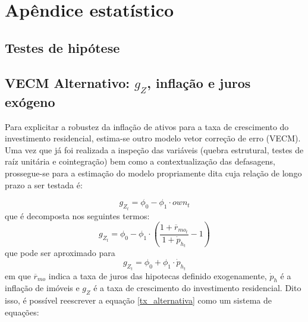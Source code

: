 \titleformat{\chapter}[display]{\normalfont\huge}{\appendixname{} \thechapter}{20pt}{\bfseries\huge}
\chapter{Apêndice estatístico}
\label{Append_Stat}

\section{Testes de hipótese}









\section{VECM Alternativo: $g_Z$, inflação e juros exógeno}

Para explicitar a robustez da inflação de ativos para a taxa de crescimento do investimento residencial, estima-se outro modelo vetor correção de erro (VECM).
Uma vez que já foi realizada a inspeção das variáveis (quebra estrutural, testes de raíz unitária e cointegração) bem como a contextualização das defasagens, prossegue-se para a estimação do modelo propriamente dita cuja relação de longo prazo a ser testada é:

$$
g_{Z_t} = \phi_{0} - \phi_1\cdot own_t
$$
que é decomposta nos seguintes termos:
$$
g_{Z_t} = \phi_{0} - \phi_1\cdot \left(\frac{1+\overline r_{mo_t}}{1+\dot p_{h_t}} -1\right)
$$
que pode ser aproximado para
\begin{equation}
\label{tx_alternativa}
g_{Z_t} = \phi_{0} + \phi_1\cdot \dot p_{h_t}
\end{equation}
em que $\overline r_{mo}$ indica a taxa de juros das hipotecas definido exogenamente, $\dot p_h$ é a inflação de imóveis e $g_Z$ é a taxa de crescimento do investimento residencial.
Dito isso, é possível reescrever a equação \ref{tx_alternativa} como um sistema de equações:


